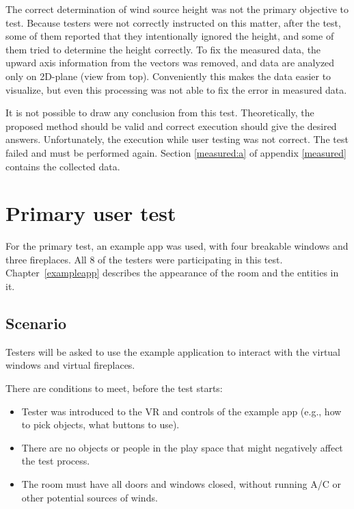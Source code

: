 The correct determination of wind source height was not the primary
objective to test. Because testers were not correctly instructed on this matter,
after the test, some of them reported that they intentionally ignored the
height, and some of them tried to determine the height correctly.
To fix the measured data, the upward axis information from the vectors was
removed, and data are analyzed only on 2D-plane (view from top).
Conveniently this makes the data easier to visualize, but even this
processing was not able to fix the error in measured data.

It is not possible to draw any conclusion from this test. Theoretically, the
proposed method should be valid and correct execution should give the
desired answers. Unfortunately, the execution while user testing was not
correct. The test failed and must be performed again. 
Section \ref{measured:a} of appendix \ref{measured} contains the collected data.


\section{Primary user test}
For the primary test, an example app was used, with four breakable windows
and three fireplaces. All 8 of the testers were participating
in this test. Chapter~\ref{exampleapp} describes the appearance of the room 
and the entities in it.

\hypertarget{x-scenario}{\subsection{Scenario}}
Testers will be asked to use the example application to interact with 
the virtual windows and virtual fireplaces.

There are conditions to meet, before the test starts:

\begin{itemize}
    \itemsep0em

\item Tester was introduced to the VR and controls of
the example app (e.g., how to pick objects, what buttons to use).

\item There are no objects or people in the play space that might negatively affect
the test process.

\item The room must have all doors and windows closed, without running A/C
or other potential sources of winds.

\end{itemize}


